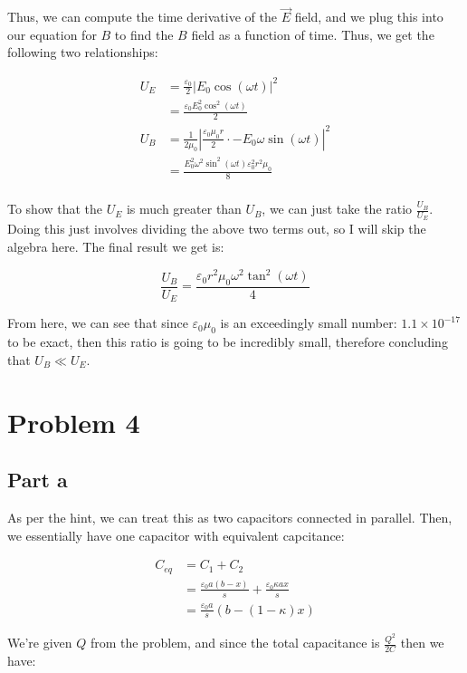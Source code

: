 \documentclass{article}
\theoremstyle{definition}
\numberwithin{equation}{section}
\numberwithin{definition}{section}
\begin{document}
Thus, we can compute the time derivative of the $\vec{E}$ field, and we plug this into our equation for $B$ to find the $B$ field as a function of time. Thus, we get the following two relationships:

\begin{align*}
    U_E &= \frac{\varepsilon_0}{2} | E_0 \cos (\omega t)|^2\\
    &= \frac{\varepsilon_0 E_0^2 \cos^2 (\omega t)}{2}\\
    U_B &= \frac{1}{2\mu_0}\left|\frac{\varepsilon_0 \mu_0 r}{2} \cdot -E_0 \omega \sin (\omega t)\right|^2\\
    &= \frac{E_0^2 \omega^2 \sin^2(\omega t)\varepsilon_0^2 r^2 \mu_0}{8}\\
\end{align*}

To show that the $U_E$ is much greater than $U_B$, we can just take the ratio $\frac{U_B}{U_E}$. Doing this just involves dividing the above two terms out, so I will skip the algebra here. The final result we get is:

\[ \frac{U_B}{U_E} = \frac{\varepsilon_0 r^2 \mu_0 \omega^2 \tan^2(\omega t)}{4}\]

From here, we can see that since $\varepsilon_0 \mu_0$ is an exceedingly small number: $1.1 \times 10^{-17}$ to be exact, then this ratio is going to be incredibly small, therefore concluding that $U_B \ll U_E$.


\section{Problem 4}

\subsection*{Part a}

As per the hint, we can treat this as two capacitors connected in parallel. Then, we essentially have one capacitor with equivalent capcitance: 

\begin{align*}
    C_{eq} &= C_1 + C_2 \\
    &= \frac{\varepsilon_0 a(b-x)}{s} + \frac{\varepsilon_0 \kappa ax}{s}\\
    &= \frac{\varepsilon_0 a}{s}(b - (1-\kappa) x)
\end{align*}

We're given $Q$ from the problem, and since the total capacitance is $\frac{Q^2}{2C}$ then we have:
\end{document}
